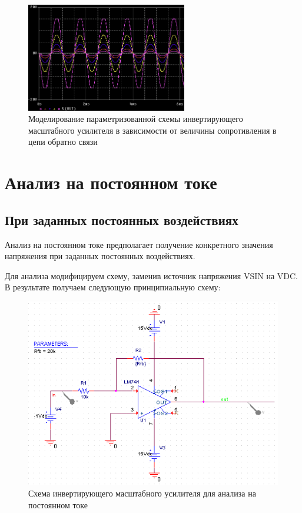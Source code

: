 \documentclass[utf8x, 12pt]{G7-32}
\begin{document}
\begin{figure}[h]
	\begin{center}
		\includegraphics[width=7cm]{img/wavefrom_1_2}
	\end{center}
	\vspace{-5mm}\caption{Моделирование параметризованной схемы инвертирующего масштабного усилителя в зависимости от величины сопротивления в цепи обратно связи}
\end{figure}	

\newpage
\section{Анализ на постоянном токе}

\subsection{При заданных постоянных воздействиях}

Анализ на постоянном токе предполагает получение конкретного значения напряжения при заданных постоянных воздействиях.

Для анализа модифицируем схему, заменив источник напряжения VSIN на VDC. В результате получаем следующую принципиальную схему:

\begin{figure}[h]
	\begin{center}
		\includegraphics[width=12cm]{img/shema_3}
	\end{center}
	\vspace{-5mm}\caption{Схема инвертирующего масштабного усилителя для анализа на постоянном токе}
\end{figure}	
\end{document}
